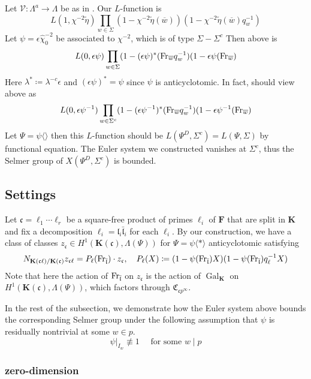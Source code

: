 \documentclass[leqno]{amsart}
\newcommand{\bw}{\overline{w}}
\newcommand{\flw}{\bar{\fl}}
\newcommand{\Fr}{\textnormal{Fr}} %
\DeclareMathOperator{\Gal}{Gal}
\newcommand{\F}{{\mathbf{F}}} %
\newcommand{\K}{{\mathbf{K}}} %
\newcommand{\rp}[1]{\mathfrak{C}_{#1}} %
\newcommand{\rk}[1]{\K({#1})} %
\newcommand{\fc}{\mathfrak{c}}
\newcommand{\fl}{\mathfrak{l}}
\theoremstyle{definition}
\theoremstyle{remark}
\begin{document}
Let $\mathscr{V}\colon \Lambda^a\to \Lambda$
be as in \cite{HT94}.
Our $L$-function is
\[
L(1,\chi^{-2}\tilde{\eta})\prod_{w\in\Sigma}
(1-\chi^{-2}\tilde{\eta}(\bw))
(1-\chi^{-2}\tilde{\eta}(\bw)q_w^{-1})
\]
Let $\psi=\epsilon\hat{\chi}_0^{-2}$ be associated to 
$\chi^{-2}$, which is of type $\Sigma-\Sigma^c$
Then above is 
\[
	L(0,\epsilon\psi)\prod_{w\in \Sigma}
	(1-(\epsilon\psi)^*(\Fr_{\bw}q_w^{-1})
	(1-\epsilon\psi(\Fr_{\bw})
\]
Here  $\lambda^*\coloneqq \lambda^{-c}\epsilon$ 
and $(\epsilon\psi)^*=\psi$ since  $\psi$
is anticyclotomic.
In fact, should view above as
\[
	L(0,\epsilon\psi^{-1})\prod_{w\in\Sigma^c}
	(1-(\epsilon\psi^{-1})^*(\Fr_{\bw}q_w^{-1})
	(1-\epsilon\psi^{-1}(\Fr_{\bw})
\]
Let $\Psi=\psi\langle\rangle$
then this  $L$-function
should be $L(\Psi^D,\Sigma^c)=L(\Psi,\Sigma)$
by functional equation.
The Euler system we constructed vanishes at  $\Sigma^c$,
thus the Selmer group of  $X(\Psi^D,\Sigma^c)$
is bounded. 


\cite{Och05}
\cite{Och08}
\cite{Hsieh2010}
\cite{HT93}
\cite{Hida06}
\cite{Hida06b}
\cite{Rubin}

\subsection{Settings}

Let $\fc=\ell_1\cdots\ell_r$
be a square-free product
of primes $\ell_i$ of  $\F$
that are split in  $\K$
and fix a decomposition
$\ell_i=\fl_i\flw_i$
for each  $\ell_i$.
By our construction, we have 
a class of classes
$z_\fc\in H^1(\rk{\fc},\Lambda(\Psi))$
for  $\Psi=\psi\langle*\rangle$ anticyclotomic 
satisfying 
\[
	N_{\rk{\fc\ell}/\rk{\fc}}z_{\fc\ell}=
	P_\ell(\Fr_{\bar{\fl}})\cdot z_\fc,\quad
	P_\ell(X)\coloneqq(1-\psi(\Fr_{\flw})X)
	(1-\psi(\Fr_{\flw})q_\ell^{-1}X)
\]
Note that here the action of $\Fr_{\flw}$
on $z_{\fc}$ is the action of $\Gal_\K$
on  $H^1(\rk{\fc},\Lambda(\Psi))$,
which factors through  $\rp{\fc p^\infty}$.

In the rest of the subsection,
we demonstrate how the Euler system above
bounds the corresponding Selmer group 
under the following assumption
that $\psi$ is residually nontrivial
at some $w\in p$.
\begin{equation}\label{cond:distinct}\tag{dist}
	\psi\vert_{I_w}\not\equiv1\quad
	\text{ for some } w\mid p
\end{equation}


\subsubsection{zero-dimension}
\end{document}
